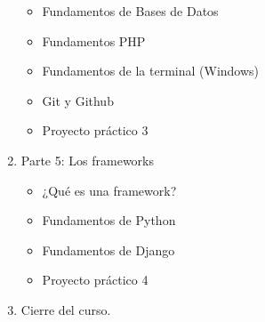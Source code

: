 \documentclass[12pt, letterpaper]{article}
\begin{document}
\begin{enumerate}
\begin{itemize}
        \item Fundamentos de Bases de Datos
        \item Fundamentos PHP
        \item Fundamentos de la terminal (Windows)
        \item Git y Github
        \item Proyecto práctico 3
    \end{itemize}
    \item Parte 5: Los frameworks
    \begin{itemize}
        \item ¿Qué es una framework?
        \item Fundamentos de Python
        \item Fundamentos de Django
        \item Proyecto práctico 4
    \end{itemize}
    \item Cierre del curso.
\end{enumerate}
\end{document}
